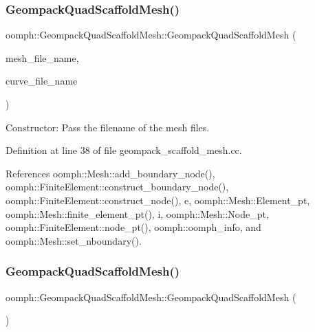 \subsubsection{\texorpdfstring{Geompack\+Quad\+Scaffold\+Mesh()}{GeompackQuadScaffoldMesh()}\hspace{0.1cm}{\footnotesize\ttfamily [2/3]}}
{\footnotesize\ttfamily oomph\+::\+Geompack\+Quad\+Scaffold\+Mesh\+::\+Geompack\+Quad\+Scaffold\+Mesh (\begin{DoxyParamCaption}\item[{const std\+::string \&}]{mesh\+\_\+file\+\_\+name,  }\item[{const std\+::string \&}]{curve\+\_\+file\+\_\+name }\end{DoxyParamCaption})}



Constructor\+: Pass the filename of the mesh files. 



Definition at line 38 of file geompack\+\_\+scaffold\+\_\+mesh.\+cc.



References oomph\+::\+Mesh\+::add\+\_\+boundary\+\_\+node(), oomph\+::\+Finite\+Element\+::construct\+\_\+boundary\+\_\+node(), oomph\+::\+Finite\+Element\+::construct\+\_\+node(), e, oomph\+::\+Mesh\+::\+Element\+\_\+pt, oomph\+::\+Mesh\+::finite\+\_\+element\+\_\+pt(), i, oomph\+::\+Mesh\+::\+Node\+\_\+pt, oomph\+::\+Finite\+Element\+::node\+\_\+pt(), oomph\+::oomph\+\_\+info, and oomph\+::\+Mesh\+::set\+\_\+nboundary().

\mbox{\label{classoomph_1_1GeompackQuadScaffoldMesh_a409945b2211b91a8f98157a84671368e}} 
\subsubsection{\texorpdfstring{Geompack\+Quad\+Scaffold\+Mesh()}{GeompackQuadScaffoldMesh()}\hspace{0.1cm}{\footnotesize\ttfamily [3/3]}}
{\footnotesize\ttfamily oomph\+::\+Geompack\+Quad\+Scaffold\+Mesh\+::\+Geompack\+Quad\+Scaffold\+Mesh (\begin{DoxyParamCaption}\item[{const \hyperlink{classoomph_1_1GeompackQuadScaffoldMesh}{Geompack\+Quad\+Scaffold\+Mesh} \&}]{ }\end{DoxyParamCaption})\hspace{0.3cm}{\ttfamily [inline]}}



